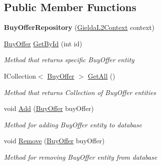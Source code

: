 \subsection*{Public Member Functions}
\begin{DoxyCompactItemize}
\item 
\mbox{\label{class_gielda_l2_1_1_i_n_f_r_a_s_t_r_u_c_t_u_r_e_1_1_repositories_1_1_buy_offer_repository_a19cad114d64f5aa1b37e7f664cb1215f}} 
{\bfseries Buy\+Offer\+Repository} (\mbox{\hyperlink{class_gielda_l2_1_1_d_b_1_1_gielda_l2_context}{Gielda\+L2\+Context}} context)
\item 
\mbox{\hyperlink{class_gielda_l2_1_1_d_b_1_1_entities_1_1_buy_offer}{Buy\+Offer}} \mbox{\hyperlink{class_gielda_l2_1_1_i_n_f_r_a_s_t_r_u_c_t_u_r_e_1_1_repositories_1_1_buy_offer_repository_adf2f5395c33786befc29d371aecee31d}{Get\+By\+Id}} (int id)
\begin{DoxyCompactList}\small\item\em Method that returns specific Buy\+Offer entity \end{DoxyCompactList}\item 
I\+Collection$<$ \mbox{\hyperlink{class_gielda_l2_1_1_d_b_1_1_entities_1_1_buy_offer}{Buy\+Offer}} $>$ \mbox{\hyperlink{class_gielda_l2_1_1_i_n_f_r_a_s_t_r_u_c_t_u_r_e_1_1_repositories_1_1_buy_offer_repository_ab0ce549916d7e0cd138454a9768ed7c5}{Get\+All}} ()
\begin{DoxyCompactList}\small\item\em Method that returns Collection of Buy\+Offer entities \end{DoxyCompactList}\item 
void \mbox{\hyperlink{class_gielda_l2_1_1_i_n_f_r_a_s_t_r_u_c_t_u_r_e_1_1_repositories_1_1_buy_offer_repository_aeffc5aeab22da20ecaa887219079c5a1}{Add}} (\mbox{\hyperlink{class_gielda_l2_1_1_d_b_1_1_entities_1_1_buy_offer}{Buy\+Offer}} buy\+Offer)
\begin{DoxyCompactList}\small\item\em Method for adding Buy\+Offer entity to database \end{DoxyCompactList}\item 
void \mbox{\hyperlink{class_gielda_l2_1_1_i_n_f_r_a_s_t_r_u_c_t_u_r_e_1_1_repositories_1_1_buy_offer_repository_a14dec5a8063f5d8b6a106f65fc6ec293}{Remove}} (\mbox{\hyperlink{class_gielda_l2_1_1_d_b_1_1_entities_1_1_buy_offer}{Buy\+Offer}} buy\+Offer)
\begin{DoxyCompactList}\small\item\em Method for removing Buy\+Offer entity from database \end{DoxyCompactList}\end{DoxyCompactItemize}
